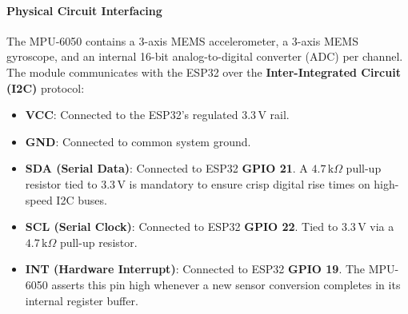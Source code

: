 \paragraph{Physical Circuit Interfacing}
The MPU-6050 contains a 3-axis MEMS accelerometer, a 3-axis MEMS gyroscope, and an internal 16-bit analog-to-digital converter (ADC) per channel. The module communicates with the ESP32 over the \textbf{Inter-Integrated Circuit (I2C)} protocol:
\begin{itemize}
    \item \textbf{VCC}: Connected to the ESP32's regulated $3.3\,\text{V}$ rail.
    \item \textbf{GND}: Connected to common system ground.
    \item \textbf{SDA (Serial Data)}: Connected to ESP32 \textbf{GPIO 21}. A $4.7\,\text{k}\Omega$ pull-up resistor tied to $3.3\,\text{V}$ is mandatory to ensure crisp digital rise times on high-speed I2C buses.
    \item \textbf{SCL (Serial Clock)}: Connected to ESP32 \textbf{GPIO 22}. Tied to $3.3\,\text{V}$ via a $4.7\,\text{k}\Omega$ pull-up resistor.
    \item \textbf{INT (Hardware Interrupt)}: Connected to ESP32 \textbf{GPIO 19}. The MPU-6050 asserts this pin high whenever a new sensor conversion completes in its internal register buffer.
\end{itemize}

